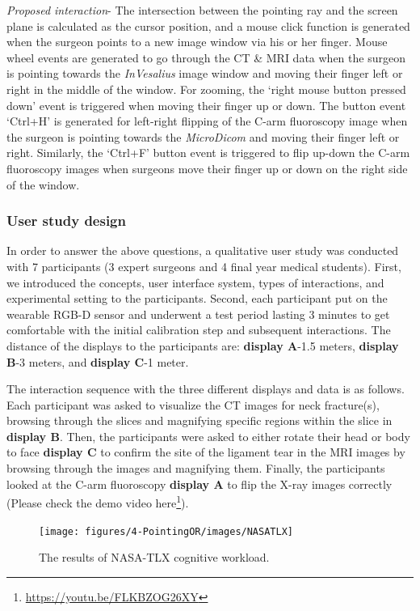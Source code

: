 \textit{Proposed interaction}- The intersection between the pointing ray and the screen plane is calculated as the cursor position, and a mouse click function is generated when the surgeon points to a new image window via his or her finger. Mouse wheel events are generated to go through the CT \& MRI data when the surgeon is pointing towards the \textit{InVesalius} image window and moving their finger left or right in the middle of the window. For zooming, the `right mouse button pressed down' event is triggered when moving their finger up or down. The button event `Ctrl+H' is generated for left-right flipping of the C-arm fluoroscopy image when the surgeon is pointing towards the \textit{MicroDicom} and moving their finger left or right. Similarly, the `Ctrl+F' button event is triggered to flip up-down the C-arm fluoroscopy images when surgeons move their finger up or down on the right side of the window.

\subsubsection{User study design}
In order to answer the above questions, a qualitative user study was conducted with 7 participants (3 expert surgeons and 4 final year medical students). First, we introduced the concepts, user interface system, types of interactions, and experimental setting to the participants. Second, each participant put on the wearable RGB-D sensor and underwent a test period lasting 3 minutes to get comfortable with the initial calibration step and subsequent interactions. The distance of the displays to the participants are: \textbf{display A}-1.5 meters, \textbf{display B}-3 meters, and \textbf{display C}-1 meter.

The interaction sequence with the three different displays and data is as follows. Each participant was asked to visualize the CT images for neck fracture(s), browsing through the slices and magnifying specific regions within the slice in \textbf{display B}. Then, the participants were asked to either rotate their head or body to face \textbf{display C} to confirm the site of the ligament tear in the MRI images by browsing through the images and magnifying them. Finally, the participants looked at the C-arm fluoroscopy \textbf{display A} to flip the X-ray images correctly (Please check the demo video here\footnote{\url{https://youtu.be/FLKBZOG26XY}}).

\begin{figure}
	\centering
	\texttt{[image: figures/4-PointingOR/images/NASATLX]}
	\caption{The results of NASA-TLX cognitive workload.}
	\label{fig:NASATLX}       %
\end{figure}
